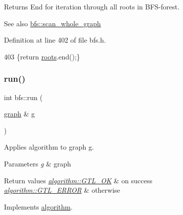 \begin{DoxyReturn}{Returns}
End for iteration through all roots in B\+F\+S-\/forest. 
\end{DoxyReturn}
\begin{DoxySeeAlso}{See also}
\mbox{\hyperlink{classbfs_a25fc51b1bfbbdd3afefe0a84c1bd2f6b}{bfs\+::scan\+\_\+whole\+\_\+graph}} 
\end{DoxySeeAlso}


Definition at line 402 of file bfs.\+h.


\begin{DoxyCode}
403     \{\textcolor{keywordflow}{return} \mbox{\hyperlink{classbfs_acea071a6fdad8e590b40830ced241824}{roots}}.end();\}
\end{DoxyCode}
\mbox{\label{classbfs_a06ae16bd0f3bb2f8eb6b3e36659ba82e}} 
\subsubsection{\texorpdfstring{run()}{run()}}
{\footnotesize\ttfamily int bfs\+::run (\begin{DoxyParamCaption}\item[{\mbox{\hyperlink{classgraph}{graph}} \&}]{g }\end{DoxyParamCaption})\hspace{0.3cm}{\ttfamily [virtual]}}



Applies algorithm to graph g. 


\begin{DoxyParams}{Parameters}
{\em g} & graph \\
\hline
\end{DoxyParams}

\begin{DoxyRetVals}{Return values}
{\em \mbox{\hyperlink{classalgorithm_af1a0078e153aa99c24f9bdf0d97f6710a5114c20e4a96a76b5de9f28bf15e282b}{algorithm\+::\+G\+T\+L\+\_\+\+OK}}} & on success \\
\hline
{\em \mbox{\hyperlink{classalgorithm_af1a0078e153aa99c24f9bdf0d97f6710a6fcf574690bbd6cf710837a169510dd7}{algorithm\+::\+G\+T\+L\+\_\+\+E\+R\+R\+OR}}} & otherwise \\
\hline
\end{DoxyRetVals}


Implements \mbox{\hyperlink{classalgorithm_a734b189509a8d6b56b65f8ff772d43ca}{algorithm}}.



